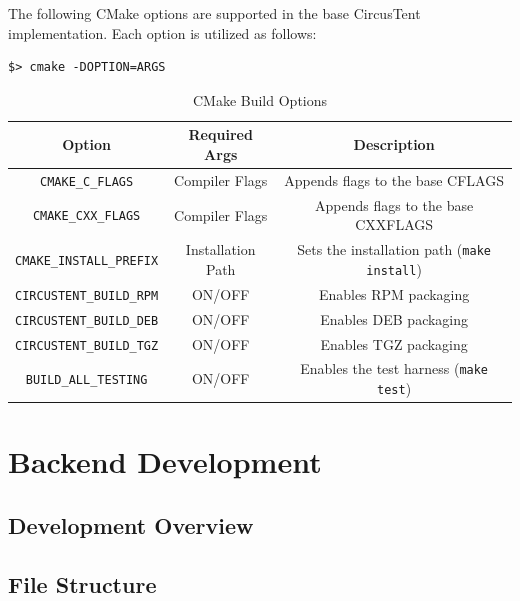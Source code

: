 \documentclass{article}
\begin{document}
The following CMake options are supported in the base CircusTent 
implementation.  Each option is utilized as follows: 

\begin{verbatim}
$> cmake -DOPTION=ARGS
\end{verbatim}

\begin{table}[!h]
\renewcommand{\arraystretch}{1.3}
\caption{CMake Build Options}
\label{tab:cmakeoptions}
\centering
\begin{tabular}{c|c|c}
\hline
\textbf{Option} & \textbf{Required Args} & \textbf{Description}\\
\hline
\texttt{CMAKE\_C\_FLAGS} & Compiler Flags & Appends flags to the base CFLAGS\\
\hline
\texttt{CMAKE\_CXX\_FLAGS} & Compiler Flags & Appends flags to the base CXXFLAGS\\
\hline
\texttt{CMAKE\_INSTALL\_PREFIX} & Installation Path & Sets the installation path (\texttt{make install})\\
\hline
\texttt{CIRCUSTENT\_BUILD\_RPM} & ON/OFF & Enables RPM packaging\\
\hline
\texttt{CIRCUSTENT\_BUILD\_DEB} & ON/OFF &  Enables DEB packaging\\
\hline
\texttt{CIRCUSTENT\_BUILD\_TGZ} & ON/OFF & Enables TGZ packaging\\
\hline
\texttt{BUILD\_ALL\_TESTING} & ON/OFF & Enables the test harness (\texttt{make test})\\
\hline
\end{tabular}
\end{table}

\clearpage
\section{Backend Development}
\label{sec:BackendDev}

\subsection{Development Overview}
\label{sec:DevelopmentOverview}

\clearpage
\subsection{File Structure}
\label{sec:FileStructure}
\end{document}
